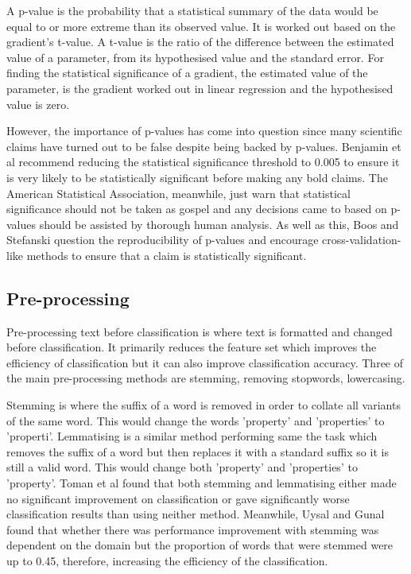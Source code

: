			A p-value is the probability that a statistical summary of the data would be equal to or more extreme than its observed value\cite{statement_p_wasserstein}. It is worked out based on the gradient's t-value. A t-value is the ratio of the difference between the estimated value of a parameter, from its hypothesised value and the standard error. For finding the statistical significance of a gradient, the estimated value of the parameter, is the gradient worked out in linear regression and the hypothesised value is zero.  

			However, the importance of p-values has come into question since many scientific claims have turned out to be false despite being backed by p-values. Benjamin et al recommend reducing the statistical significance threshold to 0.005 to ensure it is very likely to be statistically significant before making any bold claims\cite{redefine_statsig_benjamin}. The American Statistical Association, meanwhile, just warn that statistical significance should not be taken as gospel and any decisions came to based on p-values should be assisted by thorough human analysis\cite{statement_p_wasserstein}. As well as this, Boos and Stefanski question the reproducibility of p-values and encourage cross-validation-like methods to ensure that a claim is statistically significant\cite{p_reproducibility_boos}. 
		\subsection{Pre-processing}
			Pre-processing text before classification is where text is formatted and changed before classification. It primarily reduces the feature set which improves the efficiency of classification but it can also improve classification accuracy. Three of the main pre-processing methods are stemming, removing stopwords, lowercasing.
			
			Stemming is where the suffix of a word is removed in order to collate all variants of the same word. This would change the words 'property' and 'properties' to 'properti'. Lemmatising is a similar method performing same the task which removes the suffix of a word but then replaces it with a standard suffix so it is still a valid word\cite{influence_normalization_toman}. This would change both 'property' and 'properties' to 'property'. Toman et al found that both stemming and lemmatising either made no significant improvement on classification or gave significantly worse classification results than using neither method\cite{influence_normalization_toman}. Meanwhile, Uysal and Gunal found that whether there was performance improvement with stemming was dependent on the domain but the proportion of words that were stemmed were up to 0.45\cite{impact_preprocessing_uysal}, therefore, increasing the efficiency of the classification.
			
